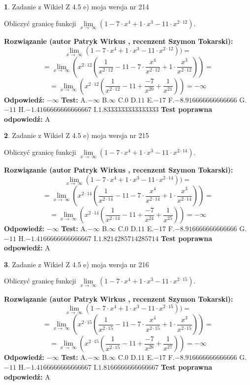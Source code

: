 \documentclass[12pt, a4paper]{article}
\theoremstyle{definition} %
\newtheorem{zad}{}
\newcommand{\zadStart}[1]{\begin{zad}#1\newline}
\newcommand{\zadStop}{\end{zad}}
\newcommand{\rozwStart}[2]{\noindent \textbf{Rozwiązanie (autor #1 , recenzent #2): }\newline}
\newcommand{\rozwStop}{\newline}
\newcommand{\odpStart}{\noindent \textbf{Odpowiedź:}\newline}
\newcommand{\odpStop}{\newline}
\newcommand{\testStart}{\noindent \textbf{Test:}\newline}
\newcommand{\testStop}{\newline}
\newcommand{\kluczStart}{\noindent \textbf{Test poprawna odpowiedź:}\newline}
\newcommand{\kluczStop}{\newline}
\begin{document}
\zadStart{Zadanie z Wikieł Z 4.5 e) moja wersja nr 214}


Obliczyć granicę funkcji  $\lim\limits_{x\to\ \infty}(1 - 7 \cdot x^{4}+1 \cdot x^{3}- 11 \cdot x^{2\cdot12})$.
\zadStop
\rozwStart{Patryk Wirkus}{Szymon Tokarski}
$$\lim\limits_{x\to\ \infty}(1 - 7 \cdot x^{4}+1 \cdot x^{3}- 11 \cdot x^{2\cdot12}))=$$
$$=\lim\limits_{x\to\ \infty}(x^{2\cdot12}(\frac{1}{x^{2\cdot12}}-11 -7 \cdot \frac{x^{4}}{x^{2\cdot12}}+1 \cdot \frac{x^{3}}{x^{2\cdot12}}))=$$
$$=\lim\limits_{x\to\ \infty}(x^{2\cdot12}(\frac{1}{x^{2\cdot12}}-11 + \frac{-7}{x^{20}}+ \frac{1}{x^{21}}))=-\infty$$
\rozwStop
\odpStart
$-\infty$
\odpStop
\testStart
A.$-\infty$ B.$\infty$ C.$0$ D.$11$ E.$-17$
F.$-8.916666666666666$ G.$-11$
H.$-1.4166666666666667$
I.$1.8333333333333333$
\testStop
\kluczStart
A
\kluczStop



\zadStart{Zadanie z Wikieł Z 4.5 e) moja wersja nr 215}


Obliczyć granicę funkcji  $\lim\limits_{x\to\ \infty}(1 - 7 \cdot x^{4}+1 \cdot x^{3}- 11 \cdot x^{2\cdot14})$.
\zadStop
\rozwStart{Patryk Wirkus}{Szymon Tokarski}
$$\lim\limits_{x\to\ \infty}(1 - 7 \cdot x^{4}+1 \cdot x^{3}- 11 \cdot x^{2\cdot14}))=$$
$$=\lim\limits_{x\to\ \infty}(x^{2\cdot14}(\frac{1}{x^{2\cdot14}}-11 -7 \cdot \frac{x^{4}}{x^{2\cdot14}}+1 \cdot \frac{x^{3}}{x^{2\cdot14}}))=$$
$$=\lim\limits_{x\to\ \infty}(x^{2\cdot14}(\frac{1}{x^{2\cdot14}}-11 + \frac{-7}{x^{24}}+ \frac{1}{x^{25}}))=-\infty$$
\rozwStop
\odpStart
$-\infty$
\odpStop
\testStart
A.$-\infty$ B.$\infty$ C.$0$ D.$11$ E.$-17$
F.$-8.916666666666666$ G.$-11$
H.$-1.4166666666666667$
I.$1.8214285714285714$
\testStop
\kluczStart
A
\kluczStop



\zadStart{Zadanie z Wikieł Z 4.5 e) moja wersja nr 216}


Obliczyć granicę funkcji  $\lim\limits_{x\to\ \infty}(1 - 7 \cdot x^{4}+1 \cdot x^{3}- 11 \cdot x^{2\cdot15})$.
\zadStop
\rozwStart{Patryk Wirkus}{Szymon Tokarski}
$$\lim\limits_{x\to\ \infty}(1 - 7 \cdot x^{4}+1 \cdot x^{3}- 11 \cdot x^{2\cdot15}))=$$
$$=\lim\limits_{x\to\ \infty}(x^{2\cdot15}(\frac{1}{x^{2\cdot15}}-11 -7 \cdot \frac{x^{4}}{x^{2\cdot15}}+1 \cdot \frac{x^{3}}{x^{2\cdot15}}))=$$
$$=\lim\limits_{x\to\ \infty}(x^{2\cdot15}(\frac{1}{x^{2\cdot15}}-11 + \frac{-7}{x^{26}}+ \frac{1}{x^{27}}))=-\infty$$
\rozwStop
\odpStart
$-\infty$
\odpStop
\testStart
A.$-\infty$ B.$\infty$ C.$0$ D.$11$ E.$-17$
F.$-8.916666666666666$ G.$-11$
H.$-1.4166666666666667$
I.$1.8166666666666667$
\testStop
\kluczStart
A
\kluczStop
\end{document}
